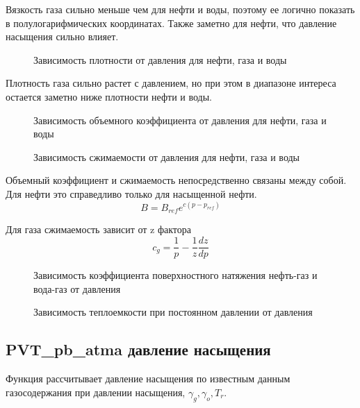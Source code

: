 Вязкость газа сильно меньше чем для нефти и воды, поэтому ее логично показать в полулогарифмических координатах. Также заметно для нефти, что давление насыщения сильно влияет.

\begin{figure}[H]
	\caption{Зависимость плотности от давления для нефти, газа и воды}
	\label{ris:density_plot}
\end{figure}

Плотность газа сильно растет с давлением, но при этом в диапазоне интереса остается заметно ниже плотности нефти и воды.

\begin{figure}[H]
	\caption{Зависимость объемного коэффициента от давления для нефти, газа и воды}
	\label{ris:FVF_plot}
\end{figure}

\begin{figure}[H]
	\caption{Зависимость сжимаемости от давления для нефти, газа и воды}
	\label{ris:compressibility_plot}
\end{figure}

Объемный коэффициент и сжимаемость непосредственно связаны между собой. Для нефти это справедливо только для насыщенной нефти. 
$$ B=B_{ref} e^{c(p-p_{ref})}$$

Для газа сжимаемость зависит от z фактора
$$c_g = \frac{1}{p} - \frac{1}{z} \frac{dz}{dp}$$

\begin{figure}[H]
	\caption{Зависимость коэффициента поверхностного натяжения нефть-газ и вода-газ от давления}
	\label{ris:st_plot}
\end{figure}

\begin{figure}[H]
	\caption{Зависимость теплоемкости при постоянном давлении от давления}
	\label{ris:heat_cap_plot}
\end{figure}

\subsection{PVT\_pb\_atma давление насыщения}
Функция рассчитывает давление насыщения по известным данным газосодержания при давлении насыщения, $\gamma_g, \gamma_o, T_r$.

